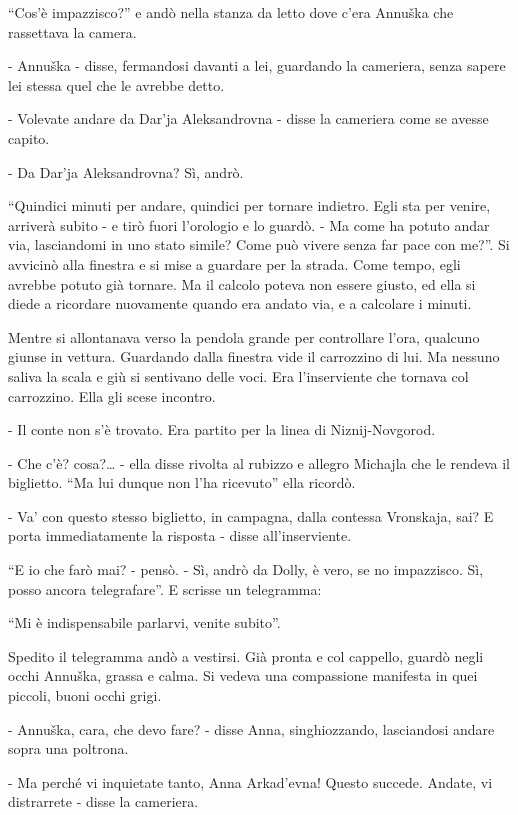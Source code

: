 ``Cos'è impazzisco?'' e andò nella stanza da letto dove c'era Annuška che rassettava la camera. 

- Annuška - disse, fermandosi davanti a lei, guardando la cameriera, senza sapere lei stessa quel che le avrebbe detto. 

- Volevate andare da Dar'ja Aleksandrovna - disse la cameriera come se avesse capito. 

- Da Dar'ja Aleksandrovna? Sì, andrò. 

``Quindici minuti per andare, quindici per tornare indietro. Egli sta per venire, arriverà subito - e tirò fuori l'orologio e lo guardò. - Ma come ha potuto andar via, lasciandomi in uno stato simile? Come può vivere senza far pace con me?''. Si avvicinò alla finestra e si mise a guardare per la strada. Come tempo, egli avrebbe potuto già tornare. Ma il calcolo poteva non essere giusto, ed ella si diede a ricordare nuovamente quando era andato via, e a calcolare i minuti. 

Mentre si allontanava verso la pendola grande per controllare l'ora, qualcuno giunse in vettura. Guardando dalla finestra vide il carrozzino di lui. Ma nessuno saliva la scala e giù si sentivano delle voci. Era l'inserviente che tornava col carrozzino. Ella gli scese incontro. 

- Il conte non s'è trovato. Era partito per la linea di Niznij-Novgorod. 

- Che c'è? cosa?\ldots{} - ella disse rivolta al rubizzo e allegro Michajla che le rendeva il biglietto. ``Ma lui dunque non l'ha ricevuto'' ella ricordò. 

- Va' con questo stesso biglietto, in campagna, dalla contessa Vronskaja, sai? E porta immediatamente la risposta - disse all'inserviente. 

``E io che farò mai? - pensò. - Sì, andrò da Dolly, è vero, se no impazzisco. Sì, posso ancora telegrafare''. E scrisse un telegramma: 

``Mi è indispensabile parlarvi, venite subito''. 

Spedito il telegramma andò a vestirsi. Già pronta e col cappello, guardò negli occhi Annuška, grassa e calma. Si vedeva una compassione manifesta in quei piccoli, buoni occhi grigi. 
\enlargethispage{\baselineskip}

- Annuška, cara, che devo fare? - disse Anna, singhiozzando, lasciandosi andare sopra una poltrona. 

- Ma perché vi inquietate tanto, Anna Arkad'evna! Questo succede. Andate, vi distrarrete - disse la cameriera. 

